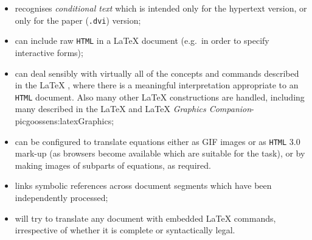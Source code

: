 \begin{itemize}
%
\item 
recognises \emph{conditional text}  which is intended only for
the hypertext version, or only for the paper (\texttt{.dvi}) version;\par
%
%
%
\item 
can include raw \texttt{HTML} in a \LaTeX{}  document 
(e.g.\ in order to specify interactive forms);

\label{hypcites}%
%
%
\item 
can deal sensibly with 
%
virtually all of the concepts and commands described in
the \LaTeX{} , 
where there is a meaningful interpretation appropriate to
an \texttt{HTML} document.
Also many other \LaTeX{} constructions are handled, including many described in the 
\LaTeX{} 
and \LaTeX{} %
{\textit{Graphics Companion}}{\Xy-pic}{goossens:latexGraphics};

%
%
%
%
%
%
\item 
can be configured to translate equations either
as GIF images or as \texttt{HTML} 3.0 mark-up
(as browsers become available which are suitable for the task),
or by making images of subparts of equations, as required.

%
%
\item 
links symbolic references across document segments which have been
independently processed;%

%
%
\item 
will try to translate any document with embedded \LaTeX{} commands, 
irrespective of whether it is complete or syntactically legal.

\end{itemize}









